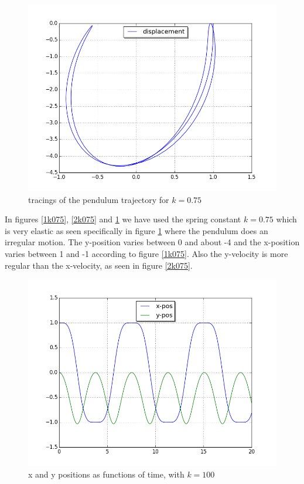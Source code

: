 \documentclass[a4paper,11pt]{article}
\theoremstyle{mytheor}
\begin{document}
\begin{figure}[!h]
\centering
\includegraphics[scale=0.5]{task1_k075_3.png}
\caption{tracings of the pendulum trajectory for $k = 0.75$}
\label{3k075}
\end{figure}

In figures \ref{1k075}, \ref{2k075} and \ref{3k075} we have used the spring constant $k = 0.75$ which is very elastic as seen specifically in figure \ref{3k075} where the pendulum does an irregular motion. The y-position varies between 0 and about -4 and the x-position varies between 1 and -1 according to figure \ref{1k075}. Also the y-velocity is more regular than the x-velocity, as seen in figure \ref{2k075}.

\begin{figure}[!h]
\centering
\includegraphics[scale=0.5]{task1_k100_1.png}
\caption{x and y positions as functions of time, with $k = 100$}
\label{1k100}
\end{figure}
\end{document}
